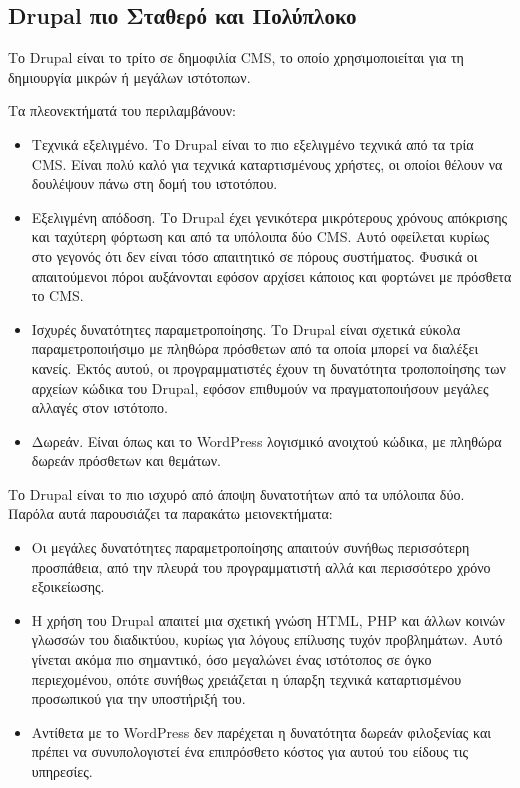 \documentclass[12pt]{report}
\begin{document}
\subsection{\textlatin{Drupal} πιο Σταθερό και Πολύπλοκο}
Το \textlatin{Drupal} είναι το τρίτο σε δημοφιλία \textlatin{CMS}, το οποίο χρησιμοποιείται για τη δημιουργία μικρών ή μεγάλων ιστότοπων.

Τα πλεονεκτήματά του περιλαμβάνουν:
\begin{itemize}
\item Τεχνικά εξελιγμένο. Το \textlatin{Drupal} είναι το πιο εξελιγμένο τεχνικά από τα τρία \textlatin{CMS}. Είναι πολύ καλό για τεχνικά καταρτισμένους χρήστες, οι οποίοι θέλουν να δουλέψουν πάνω στη δομή του ιστοτόπου.
\item Εξελιγμένη απόδοση. Το \textlatin{Drupal} έχει γενικότερα μικρότερους χρόνους απόκρισης και ταχύτερη φόρτωση και από τα υπόλοιπα δύο \textlatin{CMS}. Αυτό οφείλεται κυρίως στο γεγονός ότι δεν είναι τόσο απαιτητικό σε πόρους συστήματος. Φυσικά οι απαιτούμενοι πόροι αυξάνονται εφόσον αρχίσει κάποιος και φορτώνει με πρόσθετα το \textlatin{CMS}.
\item Ισχυρές δυνατότητες παραμετροποίησης. Το \textlatin{Drupal} είναι σχετικά εύκολα παραμετροποιήσιμο με πληθώρα πρόσθετων από τα οποία μπορεί να διαλέξει κανείς. Εκτός αυτού, οι προγραμματιστές έχουν τη δυνατότητα τροποποίησης των αρχείων κώδικα του \textlatin{Drupal}, εφόσον επιθυμούν να πραγματοποιήσουν μεγάλες αλλαγές στον ιστότοπο.
\item Δωρεάν. Είναι όπως και το \textlatin{WordPress} λογισμικό ανοιχτού κώδικα, με πληθώρα δωρεάν πρόσθετων και θεμάτων.
\end{itemize}

Το \textlatin{Drupal} είναι το πιο ισχυρό από άποψη δυνατοτήτων από τα υπόλοιπα δύο. Παρόλα αυτά παρουσιάζει τα παρακάτω μειονεκτήματα:
\begin{itemize}
\item Οι μεγάλες δυνατότητες παραμετροποίησης απαιτούν συνήθως περισσότερη προσπάθεια, από την πλευρά του προγραμματιστή αλλά και περισσότερο χρόνο εξοικείωσης.
\item Η χρήση του \textlatin{Drupal} απαιτεί μια σχετική γνώση \textlatin{HTML, PHP} και άλλων κοινών γλωσσών του διαδικτύου, κυρίως για λόγους επίλυσης τυχόν προβλημάτων. Αυτό γίνεται ακόμα πιο σημαντικό, όσο μεγαλώνει ένας ιστότοπος σε όγκο περιεχομένου, οπότε συνήθως χρειάζεται η ύπαρξη τεχνικά καταρτισμένου προσωπικού για την υποστήριξή του.
\item Αντίθετα με το \textlatin{WordPress} δεν παρέχεται η δυνατότητα δωρεάν φιλοξενίας και πρέπει να συνυπολογιστεί ένα επιπρόσθετο κόστος για αυτού του είδους τις υπηρεσίες.
\end{itemize}
\end{document}
